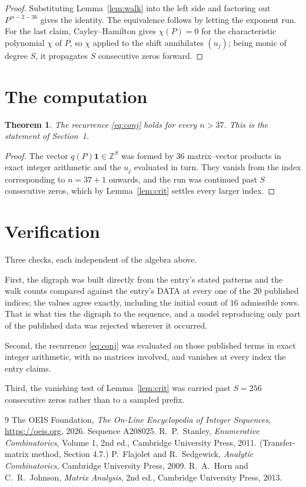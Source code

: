 \documentclass[11pt,a4paper]{article}
\theoremstyle{plain}
\newtheorem{theorem}{Theorem}
\theoremstyle{definition}
\begin{document}
\begin{proof}
Substituting Lemma~\ref{lem:walk} into the left side and factoring out
$P^{\,n-2-36}$ gives the identity. The equivalence follows by letting the exponent
run. For the last claim, Cayley--Hamilton gives $\chi(P)=0$ for the characteristic
polynomial $\chi$ of $P$, so $\chi$ applied to the shift annihilates $(u_j)$; being monic of
degree $S$, it propagates $S$ consecutive zeros forward.
\end{proof}

\section{The computation}

\begin{theorem}
The recurrence \eqref{eq:conj} holds for every $n>37$. This is the statement of
Section~1.
\end{theorem}

\begin{proof}
The vector $q(P)\mathbf{1}\in\mathbb{Z}^{S}$ was formed by $36$ matrix--vector
products in exact integer arithmetic and the $u_j$ evaluated in turn. They vanish from the
index corresponding to $n=37+1$ onwards, and the run was continued past $S$ consecutive
zeros, which by Lemma~\ref{lem:crit} settles every larger index.
\end{proof}

\section{Verification}

Three checks, each independent of the algebra above.

First, the digraph was built directly from the entry's stated patterns and the walk counts
compared against the entry's DATA at every one of the $20$ published indices; the
values agree exactly, including the initial count of $16$ admissible rows. That is
what ties the digraph to the sequence, and a model reproducing only part of the published
data was rejected wherever it occurred.

Second, the recurrence \eqref{eq:conj} was evaluated on those published terms in exact
integer arithmetic, with no matrices involved, and vanishes at every index the entry claims.

Third, the vanishing test of Lemma~\ref{lem:crit} was carried past $S=256$ consecutive
zeros rather than to a sampled prefix.

\begin{thebibliography}{9}
 The OEIS Foundation, \emph{The On-Line Encyclopedia of Integer
Sequences}, \url{https://oeis.org}, 2026. Sequence A208025.
 R.~P.~Stanley, \emph{Enumerative Combinatorics}, Volume 1, 2nd ed.,
Cambridge University Press, 2011. (Transfer-matrix method, Section 4.7.)
 P.~Flajolet and R.~Sedgewick, \emph{Analytic Combinatorics}, Cambridge
University Press, 2009.
 R.~A.~Horn and C.~R.~Johnson, \emph{Matrix Analysis}, 2nd ed., Cambridge
University Press, 2013.
\end{thebibliography}
\end{document}
